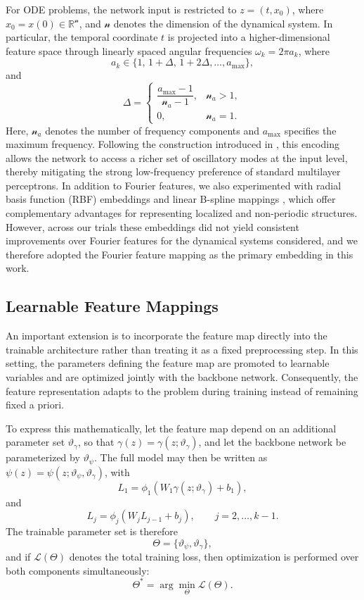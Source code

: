 \documentclass[11pt]{article}
\begin{document}
For ODE problems, the network input is restricted to \(z=(t,x_0)\), where \(x_0=x(0)\in\mathbb{R}^{\mathscr{n}}\), and \(\mathscr{n}\) denotes the dimension of the dynamical system. In particular, the temporal coordinate \(t\) is projected into a higher-dimensional feature space through linearly spaced angular frequencies \(\omega_k=2\pi a_k\), where
\[
a_k\in\{1,\,1+\Delta,\,1+2\Delta,\dots,a_{\max}\},
\]
and
\[
\Delta =
\begin{cases}
\dfrac{a_{\max}-1}{\mathscr{n}_a-1}, & \mathscr{n}_a>1, \\[1.2ex]
0, & \mathscr{n}_a=1.
\end{cases}
\]
Here, \(\mathscr{n}_a\) denotes the number of frequency components and \(a_{\max}\) specifies the maximum frequency. Following the construction introduced in \cite{tancik2020fourier}, this encoding allows the network to access a richer set of oscillatory modes at the input level, thereby mitigating the strong low-frequency preference of standard multilayer perceptrons.
In addition to Fourier features, we also experimented with radial basis function (RBF) embeddings \cite{hardy1971multiquadric,micchelli1986interpolation} and linear B-spline mappings \cite{Schumaker2007}, which offer complementary advantages for representing localized and non-periodic structures. However, across our trials these embeddings did not yield consistent improvements over Fourier features for the dynamical systems considered, and we therefore adopted the Fourier feature mapping as the primary embedding in this work.

\subsection{Learnable Feature Mappings}

An important extension is to incorporate the feature map directly into the trainable architecture rather than treating it as a fixed preprocessing step. In this setting, the parameters defining the feature map are promoted to learnable variables and are optimized jointly with the backbone network. Consequently, the feature representation adapts to the problem during training instead of remaining fixed a priori.

To express this mathematically, let the feature map depend on an additional parameter set \(\vartheta_{\gamma}\), so that \(\gamma(z)=\gamma(z;\vartheta_{\gamma})\), and let the backbone network be parameterized by \(\vartheta_{\psi}\). The full model may then be written as \(\psi(z)=\psi(z;\vartheta_{\psi},\vartheta_{\gamma})\), with
\[
L_1=\phi_1\!\left(W_1\gamma(z;\vartheta_{\gamma})+b_1\right),
\]
and
\[
L_j=\phi_j\!\left(W_jL_{j-1}+b_j\right), \qquad j=2,\dots,k-1.
\]
The trainable parameter set is therefore
\[
\Theta=\{\vartheta_{\psi},\vartheta_{\gamma}\},
\]
and if \(\mathscr{L}(\Theta)\) denotes the total training loss, then optimization is performed over both components simultaneously:
\begin{equation}
\Theta^{*}
=
\arg\min_{\Theta}\mathscr{L}(\Theta).
\end{equation}
\end{document}
